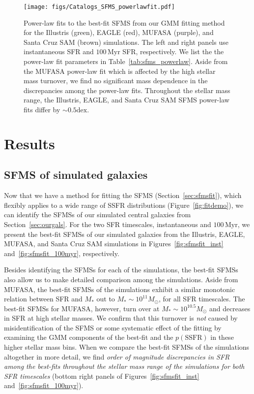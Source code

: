 \documentclass[preprint2,tighten]{aastex62}
\begin{document}
\begin{figure}
\begin{center}
\texttt{[image: figs/Catalogs\_SFMS\_powerlawfit.pdf]} 
\caption{Power-law fits to the best-fit SFMS from our GMM fitting method 
for the Illustris (green), EAGLE (red), MUFASA (purple), and Santa Cruz 
SAM (brown) simulations. The left and right panels use instantaneous SFR 
and $100\,\mathrm{Myr}$ SFR, respectively. We list the the power-law fit
parameters in Table~\ref{tab:sfms_powerlaw}. Aside from the MUFASA power-law
fit which is affected by the high stellar mass turnover, we find no significant
mass dependence in the discrepancies among the power-law fits. Throughout 
the stellar mass range, the Illustris, EAGLE, and Santa Cruz SAM SFMS power-law 
fits differ by $\sim 0.5\mathrm{dex}$. 
}\label{fig:sfmsfit_powerlaw}
\end{center}
\end{figure}

\section{Results} \label{sec:results}
\subsection{SFMS of simulated galaxies}
Now that we have a method for fitting the SFMS (Section~\ref{sec:sfmsfit}), 
which flexibly applies to a wide range of SSFR distributions 
(Figure~\ref{fig:fitdemo}), we can identify the SFMSs of our simulated
central galaxies from Section~\ref{sec:ourgals}. For the two SFR timescales,
instantaneous and $100\,\mathrm{Myr}$, we present the best-fit SFMSs of our 
simulated galaxies from the Illustris, EAGLE, MUFASA, and Santa Cruz SAM 
simulations in Figures~\ref{fig:sfmsfit_inst} and~\ref{fig:sfmsfit_100myr}, 
respectively. %

Besides identifying the SFMSs for each of the simulations, the best-fit
SFMSs also allow us to make detailed comparison among the simulations. 
Aside from MUFASA, the best-fit SFMSs of the simulations exhibit a similar
monotonic relation between SFR and $M_*$ out to $M_* \sim 10^{11}M_\odot$, for 
all SFR timescales. The best-fit SFMSs for MUFASA, however, turn over at 
$M_* \sim 10^{10.5} M_\odot$ and decreases in SFR at high stellar masses. 
We confirm that this turnover is \emph{not} caused by misidentification of 
the SFMS or some systematic effect of the fitting by examining the GMM 
components of the best-fit and the $p(\mathrm{SSFR})$ in these higher 
stellar mass bins. When we compare the best-fit SFMSs of the simulations 
altogether in more detail, we find \emph{order of magnitude discrepancies 
in SFR among the best-fits throughout the stellar mass range of the 
simulations for both SFR timescales} (bottom right panels of 
Figures~\ref{fig:sfmsfit_inst} and~\ref{fig:sfmsfit_100myr}). 
\end{document}
